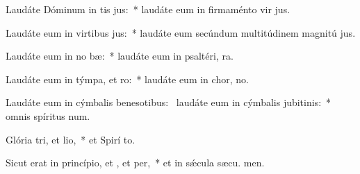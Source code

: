 \item Laudáte Dóminum in tis jus:~* laudáte eum in firmaménto vir jus.
\item Laudáte eum in virtibus jus:~* laudáte eum secúndum multitúdinem magnitú jus.
\item Laudáte eum in no bæ:~* laudáte eum in psaltéri,  ra.
\item Laudáte eum in týmpa, et ro:~* laudáte eum in chor,  no.
\item Laudáte eum in cýmbalis benesotibus:~\pscross{} laudáte eum in cýmbalis jubitinis:~* omnis spíritus  num.
\item Glória tri, et lio,~* et Spirí to.
\item Sicut erat in princípio, et , et per,~* et in sǽcula sæcu. men.
